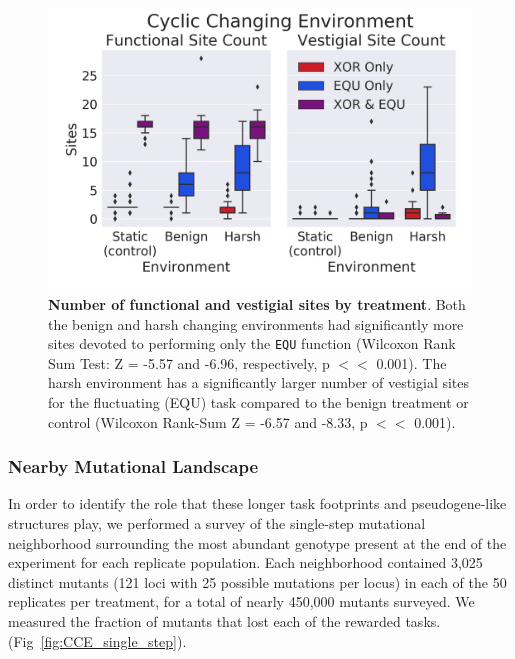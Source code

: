 \documentclass[10pt,letterpaper,final]{article}
\begin{document}
	\begin{figure}[!h]
	\includegraphics[width=0.95\columnwidth]{figures/CE/CCE_func_vest__box.png}
	\caption{\textbf{Number of functional and vestigial sites by treatment}. Both the benign and harsh changing environments had significantly more sites devoted to performing only the \texttt{EQU} function (Wilcoxon Rank Sum Test: Z = -5.57 and -6.96, respectively, p $<<$ 0.001). The harsh environment has a significantly larger number of vestigial sites for the fluctuating (EQU) task compared to the benign treatment or control (Wilcoxon Rank-Sum Z = -6.57 and -8.33, p $<<$ 0.001).
	}
	\label{fig:CCE_func_vestigial} %
	\end{figure}

\subsubsection*{Nearby Mutational Landscape}

In order to identify the role that these longer task footprints and pseudogene-like structures play, we performed a survey of the single-step mutational neighborhood surrounding the most abundant genotype present at the end of the experiment for each replicate population. Each neighborhood contained 3,025 distinct mutants (121 loci with 25 possible mutations per locus) in each of the 50 replicates per treatment, for a total of nearly 450,000 mutants surveyed. We measured the fraction of mutants that lost each of the rewarded tasks. (Fig~\ref{fig:CCE_single_step}). 
\end{document}
